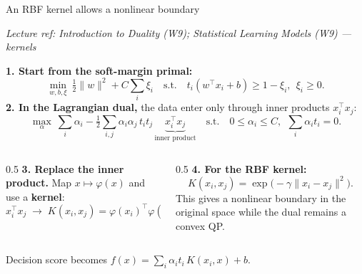 \documentclass[aspectratio=169,11pt]{beamer}
\newcommand{\lecref}[1]{{\hfill\tiny\color{softgray}\textit{Lecture ref: #1}\par}\vspace{-0.4em}}
\begin{document}
\begin{frame}{An RBF kernel allows a nonlinear boundary}
  \lecref{Introduction to Duality (W9); Statistical Learning Models (W9) --- kernels}
  \small
  \textbf{1. Start from the soft-margin primal:}
  \[
    \min_{w,b,\xi}\ \tfrac12\lVert w\rVert^2 + C\sum_i \xi_i
    \quad\text{s.t.}\quad t_i(w^\top x_i+b)\ge 1-\xi_i,\ \ \xi_i\ge 0.
  \]
  \textbf{2. In the Lagrangian dual,} the data enter \alert{only through inner products} $x_i^\top x_j$:
  \[
    \max_{\alpha}\ \sum_i \alpha_i - \tfrac12\sum_{i,j}\alpha_i\alpha_j\, t_i t_j\,\underbrace{x_i^\top x_j}_{\text{inner product}}
    \quad\text{s.t.}\quad 0\le\alpha_i\le C,\ \ \sum_i\alpha_i t_i = 0.
  \]
  \begin{columns}[T]
    \begin{column}{0.5\textwidth}
      \textbf{3. Replace the inner product.} Map $x\!\mapsto\!\varphi(x)$ and use a \textbf{kernel}:
      \[
        x_i^\top x_j \;\longrightarrow\; K(x_i,x_j)=\varphi(x_i)^\top\varphi(x_j).
      \]
    \end{column}
    \begin{column}{0.5\textwidth}
      \textbf{4. For the RBF kernel:}
      \[
        K(x_i,x_j)=\exp\!\big(-\gamma\lVert x_i-x_j\rVert^2\big).
      \]
      \small This gives a nonlinear boundary in the original space while the dual remains a convex QP.
    \end{column}
  \end{columns}
  \vspace{0.3em}
  \begin{center}
    Decision score becomes \;$f(x)=\displaystyle\sum_i \alpha_i t_i\,K(x_i,x)+b$.
  \end{center}
\end{frame}
\end{document}
